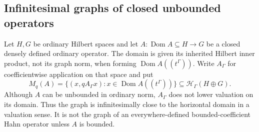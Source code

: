 \documentclass[11pt,letterpaper]{article}
\numberwithin{equation}{section}
\theoremstyle{definition}
\theoremstyle{remark}
\newcommand{\HH}[1]{\mathscr H_\Gamma(#1)}
\newcommand{\Dom}{\operatorname{Dom}}
\begin{document}
\subsection{Infinitesimal graphs of closed unbounded operators}
Let $H,G$ be ordinary Hilbert spaces and let $A:\Dom A\subseteq H\to G$ be a
closed densely defined ordinary operator. The domain is given its inherited
Hilbert inner product, not its graph norm, when forming $\Dom A((t^\Gamma))$.
Write $A_\Gamma$ for coefficientwise application on that space and put
\begin{equation}\label{hgeo:eq:unboundedgraph}
 M_q(A)=\{(x,qA_\Gamma x):
                 x\in\Dom A((t^\Gamma))\}
 \subseteq\HH{H\oplus G}.
\end{equation}
Although $A$ can be unbounded in ordinary norm, $A_\Gamma$ does not lower
valuation on its domain. Thus the graph is infinitesimally close to the
horizontal domain in a valuation sense. It is not the graph of an
everywhere-defined bounded-coefficient Hahn operator unless $A$ is bounded.
\end{document}

